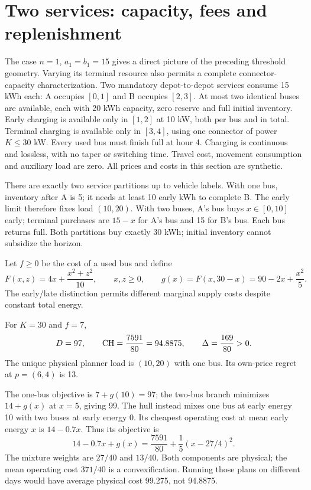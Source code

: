 \section{Two services: capacity, fees and replenishment}\label{sec:construction}
The case $n=1$, $a_1=b_1=15$ gives a direct picture of the preceding
threshold geometry. Varying its terminal resource also permits a complete
connector-capacity characterization.
Two mandatory depot-to-depot services consume 15 kWh each: A occupies
$[0,1]$ and B occupies $[2,3]$. At most two identical buses are available,
each with 20 kWh capacity, zero reserve and full initial inventory. Early
charging is available only in $[1,2]$ at 10 kW, both per bus and in total.
Terminal charging is available only in $[3,4]$, using one connector of
power $K\le30$ kW. Every used bus must finish full at hour 4. Charging is
continuous and lossless, with no taper or switching time. Travel cost,
movement consumption and auxiliary load are zero. All prices and costs in
this section are synthetic.

There are exactly two service partitions up to vehicle labels. With one
bus, inventory after A is 5; it needs at least 10 early kWh to complete B.
The early limit therefore fixes load $(10,20)$. With two buses, A's bus
buys $x\in[0,10]$ early; terminal purchases are $15-x$ for A's bus and 15
for B's bus. Each bus returns full. Both partitions buy exactly 30 kWh;
initial inventory cannot subsidize the horizon.

Let $f\ge0$ be the cost of a used bus and define
\begin{equation}\label{eq:supply}
 F(x,z)=4x+\frac{x^2+z^2}{10},\qquad x,z\ge0,
 \qquad g(x)=F(x,30-x)=90-2x+\frac{x^2}{5}.
\end{equation}
The early/late distinction permits different marginal supply costs despite
constant total energy.

\begin{theorem}\label{thm:nominal}
For $K=30$ and $f=7$,
\[
 D=97,\qquad \mathrm{CH}=\frac{7591}{80}=94.8875,\qquad
 \Delta=\frac{169}{80}>0.
\]
The unique physical planner load is $(10,20)$ with one bus. Its own-price
regret at $p=(6,4)$ is 13.
\end{theorem}

The one-bus objective is $7+g(10)=97$; the two-bus branch minimizes
$14+g(x)$ at $x=5$, giving 99. The hull instead mixes one bus at early
energy 10 with two buses at early energy 0. Its cheapest operating cost at
mean early energy $x$ is $14-0.7x$. Thus its objective is
\[
 14-0.7x+g(x)=\frac{7591}{80}+\frac15(x-27/4)^2.
\]
The mixture weights are $27/40$ and $13/40$. Both components are physical;
the mean operating cost $371/40$ is a convexification. Running those plans
on different days would have average physical cost 99.275, not 94.8875.

